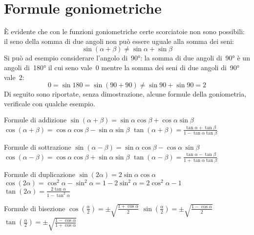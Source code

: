 \vspace{-6pt}

\section{Formule goniometriche}
\label{sec:gonio_formule}

È evidente che con le funzioni goniometriche certe scorciatoie non sono 
possibili: il seno della somma di due angoli non può essere uguale alla 
somma dei seni:
\vspace{-6pt}
\[\sin \left( \alpha + \beta \right) \ne \sin \alpha + \sin \beta\]
Si può ad esempio considerare l'angolo di~90°: la somma di due angoli di~90° 
è un angoli di~180° il cui seno vale~0 mentre la somma dei seni di  due angoli 
di~90° vale~2:
\vspace{-6pt}
\[0 = \sin 180 = \sin \left( 90 + 90 \right) \ne \sin 90 + \sin 90 = 2 \]
Di seguito sono riportate, senza dimostrazione, alcune formule della 
goniometria, verificale con qualche esempio.
\vspace{-6pt}

\begin{itemize*}
 \item Formule di addizione
  \subitem $\sin(\alpha + \beta)=\sin\alpha \cos\beta + \cos\alpha \sin\beta$
  \subitem $\cos(\alpha + \beta)=\cos\alpha \cos\beta - \sin\alpha \sin\beta$
  \subitem $\tan(\alpha + \beta)=\frac {\tan\alpha + \tan\beta} 
                                        {1 - \tan\alpha \tan\beta}$
 \item Formule di sottrazione
  \subitem $\sin(\alpha - \beta)=\sin\alpha \cos\beta - \cos\alpha \, \sin\beta$
  \subitem $\cos(\alpha - \beta)=\cos\alpha \cos\beta + \sin\alpha \sin\beta$
  \subitem $\tan(\alpha - \beta)=\frac {\tan\alpha - \tan\beta} 
                                        {1 + \tan\alpha \tan\beta}$
 \item Formule di duplicazione
  \subitem $\sin(2\alpha)=2\sin\alpha \cos\alpha$
  \subitem $\cos(2\alpha)=\cos^2\alpha - \sin^2\alpha = 1 - 2\sin^{2}\alpha = 
            2\cos^{2}\alpha - 1$
  \subitem $\tan(2\alpha)=\frac{2\tan\alpha}{1 - \tan^2\alpha}$
 \item Formule di bisezione
  \subitem $\cos\left(\frac{\alpha} 2\right)=\pm\sqrt{\frac{1+\cos\alpha}{2} }$
  \subitem $\sin\left(\frac{\alpha} 2\right)=\pm\sqrt{\frac{1-\cos\alpha}{2} }$
  \subitem $\tan\left(\frac{\alpha} 2\right)=\pm\sqrt{\frac{1-\cos\alpha}
                                                           {1+\cos\alpha}}$
\end{itemize*}


